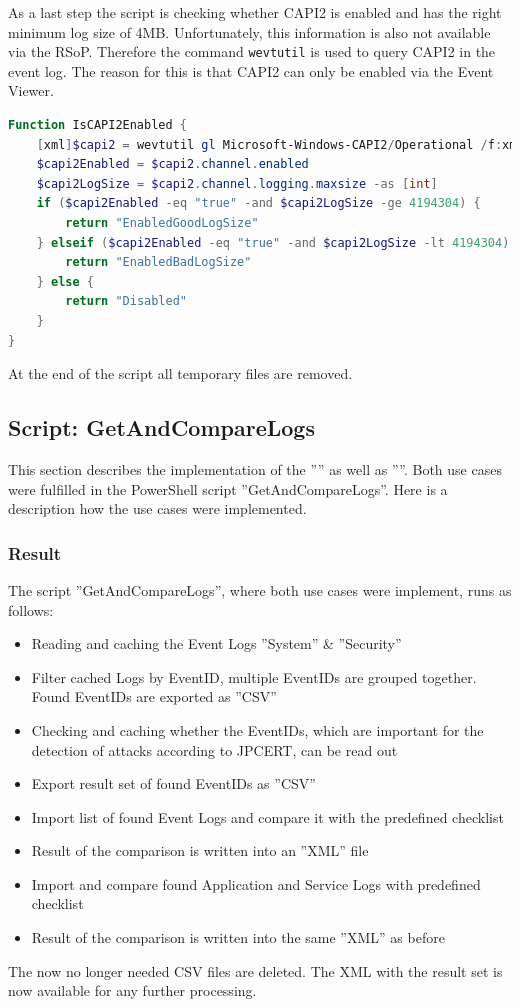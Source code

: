 As a last step the script is checking whether CAPI2 is enabled and has the right minimum log size of 4MB. Unfortunately, this information is also not available via the RSoP. Therefore the command \lstinline|wevtutil| is used to query CAPI2 in the event log. The reason for this is that CAPI2 can only be enabled via the Event Viewer. \cite{CAPI2} 
\begin{lstlisting}[caption=Function IsCAPI2Enabled, language=PowerShell]
Function IsCAPI2Enabled {
    [xml]$capi2 = wevtutil gl Microsoft-Windows-CAPI2/Operational /f:xml
    $capi2Enabled = $capi2.channel.enabled
    $capi2LogSize = $capi2.channel.logging.maxsize -as [int]
    if ($capi2Enabled -eq "true" -and $capi2LogSize -ge 4194304) {
        return "EnabledGoodLogSize"
    } elseif ($capi2Enabled -eq "true" -and $capi2LogSize -lt 4194304) {
        return "EnabledBadLogSize"
    } else {
        return "Disabled"
    }
}    
\end{lstlisting}
At the end of the script all temporary files are removed.
\clearpage

\subsection{Script: GetAndCompareLogs}
This section describes the implementation of the '''' as well as ''''. Both use cases were fulfilled in the PowerShell script ''GetAndCompareLogs''. Here is a description how the use cases were implemented.

\subsubsection{Result}
The script ''GetAndCompareLogs'', where both use cases were implement, runs as follows:
\begin{itemize}
    \item Reading and caching the Event Logs ''System'' \& ''Security''
    \item Filter cached Logs by EventID, multiple EventIDs are grouped together. Found EventIDs are exported as ''CSV''
    \item Checking and caching whether the EventIDs, which are important for the detection of attacks according to JPCERT, can be read out
    \item Export result set of found EventIDs as ''CSV''
    \item Import list of found Event Logs and compare it with the predefined checklist
    \item Result of the comparison is written into an ''XML'' file
    \item Import and compare found Application and Service Logs with predefined checklist
    \item Result of the comparison is written into the same ''XML'' as before
\end{itemize}
The now no longer needed CSV files are deleted. The XML with the result set is now available for any further processing.

